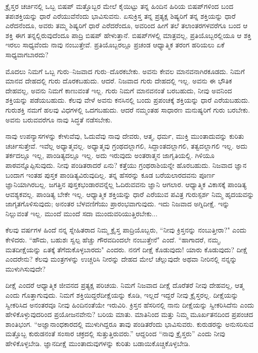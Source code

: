  ಕ್ರೈಸ್ತರ ಚರ್ಚಿನಲ್ಲಿ ಒಬ್ಬ ಬಿಷಪ್ ಮತ್ತೊಬ್ಬರ ಮೇಲೆ ಕೈಯಿಟ್ಟು ತನ್ನ ಹಿಂದಿನ ಹಿರಿಯ ಬಿಷಪ್‌ಗಳಿಂದ ಬಂದ ತಪಃಶಕ್ತಿಯನ್ನು ಧಾರೆ ಎರೆಯುವೆನೆಂದು ಭಾವಿಸುವನು. ಏಸುಕ್ರಿಸ್ತ ತನ್ನ ಪ್ರತ್ಯಕ್ಷ ಶಿಷ್ಯರಿಗೆ ತನ್ನ ಶಕ್ತಿಯನ್ನು ಧಾರೆ ಎರೆದನೆಂದೂ, ಅವರು ತಮ್ಮ ಶಿಷ್ಯರಿಗೆ ಧಾರೆ ಎರೆದರೆಂದೂ, ಅವರಿಂದ ಹೀಗೆ ತಲೆ ತಲಾಂತರಗಳವರೆಗೂ ಬಂದ ಆ ಶಕ್ತಿ ಈಗ ತನ್ನಲ್ಲಿರುವುದೆಂದೂ ಪಾದ್ರಿ ಬಿಷಪ್ ಹೇಳುತ್ತಾನೆ. ಬಿಷಪ್‌ಗಳಲ್ಲಿ ಮಾತ್ರವಲ್ಲ, ಪ್ರತಿಯೊಬ್ಬರಲ್ಲಿಯೂ ಆ ಶಕ್ತಿ ಇರಲು ಸಾಧ್ಯವೆಂದು ನಾವು ನಂಬುತ್ತೇವೆ. ಪ್ರತಿಯೊಬ್ಬರಲ್ಲೂ ಪ್ರಚಂಡ ಆಧ್ಯಾತ್ಮಿಕ ತರಂಗ ಹರಿಯಲು ಏಕೆ ಸಾಧ್ಯವಾಗಬಾರದು?

ಮೊದಲು ನಿಮಗೆ ಒಬ್ಬ ಗುರು–ನಿಜವಾದ ಗುರು–ದೊರಕಬೇಕು. ಅವನು ಕೇವಲ ಮಾನವನಾಗಿರಕೂಡದು. ನಿಮಗೆ ಮಾನವ ದೇಹದಲ್ಲಿ ಗುರು ದೊರಕಬಹುದು. ಆದರೆ. ನಿಜವಾದ ಗುರು ದೇಹದಲ್ಲಿ ಇಲ್ಲ. ಅವನು ಈ ಭೌತಿಕ ದೇಹವಲ್ಲ, ಅವನು ನಿಮಗೆ ಕಾಣುವಂತೆ ಇಲ್ಲ. ಗುರು ನಿಮಗೆ ಮಾನವನಂತೆ ಬರಬಹುದು, ನೀವು ಅವನಿಂದ ಶಕ್ತಿಯನ್ನು ಪಡೆಯಬಹುದು. ಕೆಲವು ವೇಳೆ ಅವನು ಕನಸಿನಲ್ಲಿ ಬಂದು ಪ್ರಪಂಚಕ್ಕೆ ಶಕ್ತಿಯನ್ನು ಧಾರೆ ಎರೆಯಬಹುದು. ಗುರುಶಕ್ತಿ ನಮಗೆ ಹಲವು ವಿಧಗಳಲ್ಲಿ ಒದಗಬಹುದು. ಆದರೆ ನಮ್ಮಂತಹ ಸಾಧಾರಣ ಮನುಷ್ಯರಿಗೆ ಗುರು ಬರಬೇಕು. ಅವನು ಬರುವವರೆಗೂ ನಾವು ಸಿದ್ಧತೆ ನಡೆಸಬೇಕು.

ನಾವು ಉಪನ್ಯಾಸಗಳನ್ನು ಕೇಳುವೆವು, ಓದುವೆವು ನಾವು ದೇವರು, ಆತ್ಮ, ಧರ್ಮ, ಮುಕ್ತಿ ಮುಂತಾದುವನ್ನು ಕುರಿತು ಚರ್ಚಿಸುತ್ತೇವೆ. ಇವೆಲ್ಲ ಅಧ್ಯಾತ್ಮವಲ್ಲ. ಅಧ್ಯಾತ್ಮವು ಗ್ರಂಥದಲ್ಲಾಗಲಿ, ಸಿದ್ದಾಂತದಲ್ಲಾಗಲಿ, ತತ್ವದಲ್ಲಾಗಲಿ ಇಲ್ಲ. ಅದು ತರ್ಕದಲ್ಲೂ ಇಲ್ಲ, ಪಾಂಡಿತ್ಯದಲ್ಲೂ ಇಲ್ಲ. ಅದು ಇರುವುದು ಅಂತರಾತ್ಮನ ಜಾಗೃತಿಯಲ್ಲಿ. ಗಿಳಿಯೂ ಪಾಠವನ್ನೊಪ್ಪಿಸುವುದು. ನೀವು ಪಂಡಿತರಾದರೆ ಏನು? ಕತ್ತೆಯು ಗ್ರಂಥರಾಶಿಯನ್ನೇ ಹೊರಬಹುದು. ನಿಜವಾದ ಜ್ಞಾನ ಬಂದಾಗ ಇಂತಹ ಪುಸ್ತಕ ಪಾಂಡಿತ್ಯವಿರುವುದಿಲ್ಲ. ತನ್ನ ಹೆಸರನ್ನು ಕೂಡ ಬರೆಯಲಾರದವನು ಪೂರ್ಣ ಜ್ಞಾನಿಯಾಗಿರಬಲ್ಲ. ಜಗತ್ತಿನ ಪುಸ್ತಕಭಂಡಾರವನ್ನೆಲ್ಲ ಓದಿರುವವನು ಜ್ಞಾನಿ ಆಗಲಾರ. ಆಧ್ಯಾತ್ಮಿಕ ವಿಕಾಸಕ್ಕೆ ಪಾಂಡಿತ್ಯ ಆವಶ್ಯಕವಲ್ಲ. ಪಾಂಡಿತ್ಯ ಬೇಕೇ ಇಲ್ಲ. ಆಧ್ಯಾತ್ಮಿಕ ಶಕ್ತಿಯನ್ನು ಧಾರೆ ಎರೆಯುವ ಪವಿತ್ರ ಗುರುಸ್ಪರ್ಶ ನಿಮ್ಮ ಹೃದಯವನ್ನು ಜಾಗೃತಗೊಳಿಸುವುದು; ಅನಂತರ ಬೆಳವಣಿಗೆಯು ಪ್ರಾರಂಭವಾಗುವುದು. ಇದು ನಿಜವಾದ ಅಗ್ನಿದೀಕ್ಷೆ. ಇನ್ನು ನಿಲ್ಲುವಂತೆ ಇಲ್ಲ. ಮುಂದೆ ಮುಂದೆ ಸದಾ ಮುಂದುವರಿಯುತ್ತಿರಬೇಕು...

\vskip -2pt

ಕೆಲವು ವರ್ಷಗಳ ಹಿಂದೆ ನನ್ನ ಸ್ನೇಹಿತರಾದ ನಿಮ್ಮ ಕ್ರೈಸ್ತ ಪಾದ್ರಿಯೊಬ್ಬರು, “ನೀವು ಕ್ರಿಸ್ತನನ್ನು ನಂಬುತ್ತೀರಾ?" ಎಂದು ಕೇಳಿದರು. “ಹೌದು, ಬಹುಶಃ ಸ್ವಲ್ಪ ಹೆಚ್ಚು ಗೌರವದಿಂದಲೇ ನಂಬುತ್ತೇನೆ" ಎಂದೆ. “ಹಾಗಾದರೆ, ನಮ್ಮ, ಮತದೀಕ್ಷೆಯನ್ನು ಏತಕ್ಕೆ ತೆಗೆದುಕೊಳ್ಳಬಾರದು" ಎಂದರು. ನನಗೆ ದೀಕ್ಷೆ ಕೊಡುವುದು! ಯಾರು ಕೊಡುವುದು? ದೀಕ್ಷೆ ಎಂದರೇನು? ಕೆಲವು ಮಂತ್ರಗಳನ್ನು ಉಚ್ಚರಿಸಿ ನೀರನ್ನು ದೇಹದ ಮೇಲೆ ಚೆಲ್ಲುವುದೇ ಅಥವಾ ನೀರಿನಲ್ಲಿ ನನ್ನನ್ನು ಮುಳುಗಿಸುವುದೇ?

\vskip -2pt

ದೀಕ್ಷೆ ಎಂದರೆ ಆಧ್ಯಾತ್ಮಿಕ ಜೀವನದ ಪ್ರತ್ಯಕ್ಷ ಪರಿಚಯ. ನಿಮಗೆ ನಿಜವಾದ ದೀಕ್ಷೆ ದೊರೆತರೆ ನೀವು ದೇಹವಲ್ಲ, ಆತ್ಮ ಎಂದು ಗೊತ್ತಾಗುವುದು. ನಿಮಗೆ ಶಕ್ತಿಯಿದ್ದರೆ\break ದೀಕ್ಷೆಯನ್ನು ಕೊಡಿ, ಇಲ್ಲದೆ ಇದ್ದರೆ ನೀವು ಕ್ರೈಸ್ತರಲ್ಲ. ದೀಕ್ಷೆಯನ್ನು ಸ್ವೀಕರಿಸಿದ ಅನಂತರವೂ ನೀವು ಹಿಂದಿನಂತೆಯೇ ಇರುವಿರಿ. ಕ್ರಿಸ್ತನ ಹೆಸರಿನಲ್ಲಿ ನಾನು ದೀಕ್ಷೆಯನ್ನು ಸ್ವೀಕರಿಸಿದೆನು ಎಂದು ಹೇಳಿಕೊಳ್ಳುವುದರಿಂದ ಪ್ರಯೋಜನವೇನು? ಬರಿಯ ಮಾತು. ಮಾತಿನಿಂದ ಮತ್ತು ನಿಮ್ಮ ಮೂರ್ಖತನದಿಂದ ಪ್ರಪಂಚದ ಶಾಂತಿಭಂಗ. “ಅಜ್ಞಾನಾಂಧಕಾರದಲ್ಲಿ ಮುಳುಗಿದ್ದರೂ ತಾವು ಪಂಡಿತರೆಂದು ಭಾವಿಸುವರು. ಕುರುಡರನ್ನು ಅನುಸರಿಸುವ ಮತ್ತೊಬ್ಬ ಕುರುಡನಂತೆ ಸಂಸಾರ ಚಕ್ರದಲ್ಲಿ ಸುತ್ತುತ್ತಿರುವರು.” ಆದ್ದರಿಂದ “ನಾವು ಕ್ರೈಸ್ತರು'' ಎಂದು ನೀವು ಹೇಳಿಕೊಳ್ಳಬೇಡಿ. ಜ್ಞಾನದೀಕ್ಷೆ ಮುಂತಾದುವುಗಳನ್ನು ಕುರಿತು ಬಡಾಯಿಕೊಚ್ಚಿಕೊಳ್ಳಬೇಡಿ.

